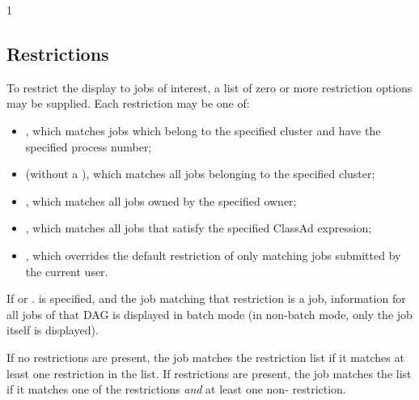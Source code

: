 \begin{ManPage}{\label{man-condor-q}}{1}
\subsection*{Restrictions}
To restrict the display to jobs of interest, a list of zero or more 
restriction options may be supplied.  Each restriction may be one of:
\begin{itemize}
	\item {}, which matches jobs which
		belong to the specified cluster and have the specified process number;
	\item {} (without a ), which matches all jobs belonging
		to the specified cluster;
	\item {}, which matches all jobs owned by the specified owner;
	\item {}, which matches all jobs that
		satisfy the specified ClassAd expression;
	\item {}, which overrides the default
		restriction of only matching jobs submitted by the
		current user.
\end{itemize}

If  or . is specified, and
the job matching that restriction is a  job, information
for all jobs of that DAG is displayed in batch mode (in non-batch
mode, only the  job itself is displayed).

If no  restrictions are present, the job matches the 
restriction list if it matches at least one restriction in the list.  If 
 restrictions are present, the job matches the list if it matches 
one of the  restrictions \emph{and} at least one non- 
restriction.

\begin{Options}
  \ToolDebugDesc
\end{Options}
\end{ManPage}
